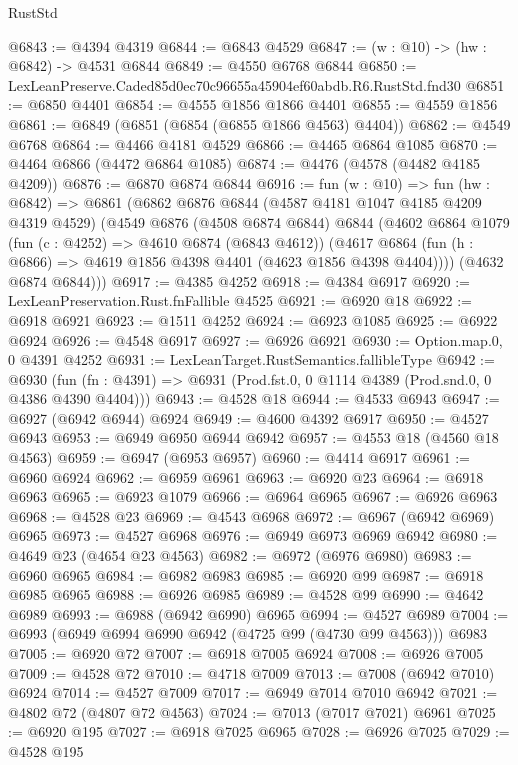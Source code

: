 \begin{lexlean}{RustStd}
\begin{coremodule}
@6843 := @4394 @4319
@6844 := @6843 @4529
@6847 := (w : @10) -> (hw : @6842) -> @4531 @6844
@6849 := @4550 @6768 @6844
@6850 := LexLeanPreserve.Caded85d0ec70c96655a45904ef60abdb.R6.RustStd.fnd30
@6851 := @6850 @4401
@6854 := @4555 @1856 @1866 @4401
@6855 := @4559 @1856
@6861 := @6849 (@6851 (@6854 (@6855 @1866 @4563) @4404))
@6862 := @4549 @6768
@6864 := @4466 @4181 @4529
@6866 := @4465 @6864 @1085
@6870 := @4464 @6866 (@4472 @6864 @1085)
@6874 := @4476 (@4578 (@4482 @4185 @4209))
@6876 := @6870 @6874 @6844
@6916 := fun (w : @10) =>
  fun (hw : @6842) =>
  @6861
    (@6862
      @6876
      @6844
      (@4587 @4181 @1047 @4185 @4209 @4319 @4529)
      (@4549
        @6876
        (@4508 @6874 @6844)
        @6844
        (@4602
          @6864
          @1079
          (fun (c : @4252) => @4610 @6874 (@6843 @4612))
          (@4617 @6864 (fun (h : @6866) => @4619 @1856 @4398 @4401 (@4623 @1856 @4398 @4404))))
        (@4632 @6874 @6844)))
@6917 := @4385 @4252
@6918 := @4384 @6917
@6920 := LexLeanPreservation.Rust.fnFallible @4525
@6921 := @6920 @18
@6922 := @6918 @6921
@6923 := @1511 @4252
@6924 := @6923 @1085
@6925 := @6922 @6924
@6926 := @4548 @6917
@6927 := @6926 @6921
@6930 := Option.map.{0, 0} @4391 @4252
@6931 := LexLeanTarget.RustSemantics.fallibleType
@6942 := @6930
    (fun (fn : @4391) => @6931 (Prod.fst.{0, 0} @1114 @4389 (Prod.snd.{0, 0} @4386 @4390 @4404)))
@6943 := @4528 @18
@6944 := @4533 @6943
@6947 := @6927 (@6942 @6944) @6924
@6949 := @4600 @4392 @6917
@6950 := @4527 @6943
@6953 := @6949 @6950 @6944 @6942
@6957 := @4553 @18 (@4560 @18 @4563)
@6959 := @6947 (@6953 @6957)
@6960 := @4414 @6917
@6961 := @6960 @6924
@6962 := @6959 @6961
@6963 := @6920 @23
@6964 := @6918 @6963
@6965 := @6923 @1079
@6966 := @6964 @6965
@6967 := @6926 @6963
@6968 := @4528 @23
@6969 := @4543 @6968
@6972 := @6967 (@6942 @6969) @6965
@6973 := @4527 @6968
@6976 := @6949 @6973 @6969 @6942
@6980 := @4649 @23 (@4654 @23 @4563)
@6982 := @6972 (@6976 @6980)
@6983 := @6960 @6965
@6984 := @6982 @6983
@6985 := @6920 @99
@6987 := @6918 @6985 @6965
@6988 := @6926 @6985
@6989 := @4528 @99
@6990 := @4642 @6989
@6993 := @6988 (@6942 @6990) @6965
@6994 := @4527 @6989
@7004 := @6993 (@6949 @6994 @6990 @6942 (@4725 @99 (@4730 @99 @4563))) @6983
@7005 := @6920 @72
@7007 := @6918 @7005 @6924
@7008 := @6926 @7005
@7009 := @4528 @72
@7010 := @4718 @7009
@7013 := @7008 (@6942 @7010) @6924
@7014 := @4527 @7009
@7017 := @6949 @7014 @7010 @6942
@7021 := @4802 @72 (@4807 @72 @4563)
@7024 := @7013 (@7017 @7021) @6961
@7025 := @6920 @195
@7027 := @6918 @7025 @6965
@7028 := @6926 @7025
@7029 := @4528 @195

\end{coremodule}
\end{lexlean}
